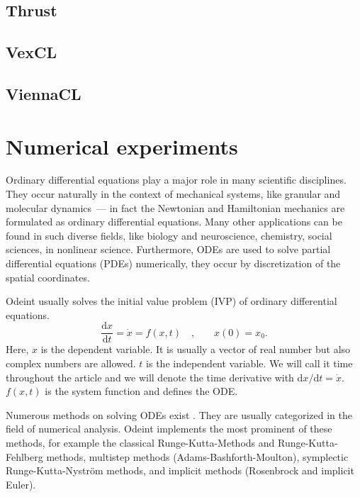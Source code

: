\documentclass[1p]{elsarticle}
\newcommand {\de} {\mbox{d}}
\begin{document}
\subsection{Thrust}
\subsection{VexCL}
\subsection{ViennaCL}














\section{Numerical experiments}

Ordinary differential equations play a major role in many scientific
disciplines. They occur naturally in the context of mechanical
systems, like granular and molecular dynamics~--- in fact the Newtonian
and Hamiltonian mechanics are formulated as ordinary differential
equations. Many other applications can be found in such diverse
fields, like biology and neuroscience, chemistry, social sciences, in
nonlinear science. Furthermore, ODEs are used to solve partial
differential equations (PDEs) numerically, they occur by discretization of
the spatial coordinates.

Odeint usually solves the initial value problem (IVP) of ordinary differential
equations.
\begin{equation}
\frac{\de x}{\de t } = \dot{x} = f(x , t) \quad \text{,} \quad \quad x(0) =
x_0.
\end{equation}
Here, $x$ is the dependent variable. It is usually a vector of real
number but also complex numbers are allowed. $t$ is the independent
variable. We will call it time throughout the article and we will
denote the time derivative with $\de x / \de t = \dot{x}$. $f(x,t)$
is the system function and defines the ODE.

Numerous methods on solving ODEs exist \cite{HairerSolvingODEI,
HairerSolvingODEII, HairerGeometricNumericalIntegration2006}. They are usually
categorized in the field of numerical analysis. Odeint implements the most
prominent of these methods, for example the classical Runge-Kutta-Methods and
Runge-Kutta-Fehlberg methods, multistep methods (Adams-Bashforth-Moulton),
symplectic Runge-Kutta-Nystr\"om methods, and implicit methods (Rosenbrock and
implicit Euler).
\end{document}

